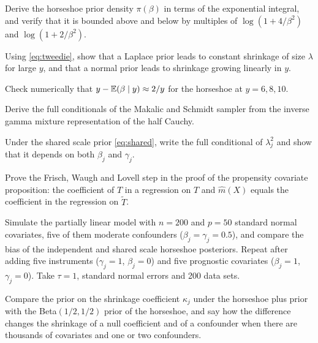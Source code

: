 \begin{exercises}
\item\label{ex:ch07:1} Derive the horseshoe prior density $\pi(\beta)$ in terms of the exponential integral, and verify that it is bounded above and below by multiples of $\log(1 + 4/\beta^2)$ and $\log(1+2/\beta^2)$.
\item\label{ex:ch07:2} Using \eqref{eq:tweedie}, show that a Laplace prior leads to constant shrinkage of size $\lambda$ for large $y$, and that a normal prior leads to shrinkage growing linearly in $y$.
\item\label{ex:ch07:3} Check numerically that $y - \mathbb{E}(\beta \mid y) \approx 2/y$ for the horseshoe at $y = 6, 8, 10$.
\item\label{ex:ch07:4} Derive the full conditionals of the Makalic and Schmidt sampler from the inverse gamma mixture representation of the half Cauchy.
\item\label{ex:ch07:5} Under the shared scale prior \eqref{eq:shared}, write the full conditional of $\lambda_j^2$ and show that it depends on both $\beta_j$ and $\gamma_j$.
\item\label{ex:ch07:6} Prove the Frisch, Waugh and Lovell step in the proof of the propensity covariate proposition: the coefficient of $T$ in a regression on $T$ and $\hat m(X)$ equals the coefficient in the regression on $\tilde T$.
\item\label{ex:ch07:7} Simulate the partially linear model with $n = 200$ and $p = 50$ standard normal covariates, five of them moderate confounders ($\beta_j = \gamma_j = 0.5$), and compare the bias of the independent and shared scale horseshoe posteriors. Repeat after adding five instruments ($\gamma_j = 1$, $\beta_j = 0$) and five prognostic covariates ($\beta_j = 1$, $\gamma_j = 0$). Take $\tau = 1$, standard normal errors and 200 data sets.
\item\label{ex:ch07:8} Compare the prior on the shrinkage coefficient $\kappa_j$ under the horseshoe plus prior with the Beta$(1/2, 1/2)$ prior of the horseshoe, and say how the difference changes the shrinkage of a null coefficient and of a confounder when there are thousands of covariates and one or two confounders.


\end{exercises}

